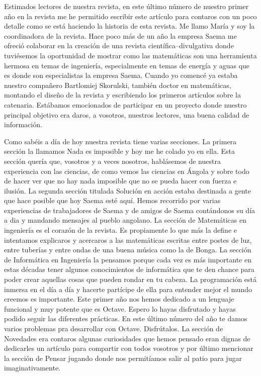 \begin{multicols}{2}
\cappar Estimados lectores de nuestra revista, en este último número de nuestro primer año en la revista me he permitido escribir este artículo para contaros con un poco detalle como se está haciendo la historia de esta revista. Me llamo María y soy la coordinadora de la revista. Hace poco más de un año la empresa Saema me ofreció colaborar en la creación de una revista científica--divulgativa donde tuviésemos la oportunidad de mostrar como las matemáticas son una herramienta hermosa en temas de ingeniería, especialmente en temas de energía y aguas que es donde son especialistas la empresa Saema. Cuando yo comencé ya estaba nuestro compañero Bartlomiej Skorulski, también doctor en matemáticas, montando el diseño de la revista y escribiendo los primeros artículos sobre la catenaria. Estábamos emocionados de participar en un proyecto donde nuestro principal objetivo era daros, a vosotros, nuestros lectores, una buena calidad de información.

 Como sabéis a día de hoy nuestra revista tiene varias secciones. La primera sección la llamamos Nada es imposible y hoy me he colado yo en ella. Esta sección quería que, vosotros y a veces nosotros, hablásemos de nuestra experiencia con las ciencias, de como vemos las ciencias en Ángola y sobre todo de hacer ver que no hay nada imposible que no se pueda hacer con fuerza e ilusión. La segunda sección titulada Solución en acción estaba destinada a gente que hace posible que hoy Saema esté aquí. Hemos recorrido por varias experiencias de trabajadores de Saema y de amigos de Saema contándonos su día a dia y mandando mensajes al pueblo angolano. La sección de Matemáticas en ingeniería es el corazón de la revista. Es propiamente lo que más la define e intentamos explicaros y acercaros a las matemáticas escritas entre postes de luz, entre tuberías y entre ondas de una buena música como la de Bonga. La sección de Informática en Ingeniería la pensamos porque cada vez es más importante en estas décadas tener algunos conocimientos de informática que te den chance para poder crear aquellas cosas que pueden rondar en tu cabeza. La programación está inmersa en el día a día y hacerte partícipe de ella para entender mejor el mundo creemos es importante. Este primer año nos hemos dedicado a un lenguaje funcional y muy potente que es Octave. Espero lo hayas disfrutado y hayas podido seguir las diferentes prácticas. En este último número del año te damos varios problemas pra desarrollar con Octave. Disfrútalos. La sección de Novedades era contaros algunas curiosidades que hemos pensado eran dignas de dedicarles un artículo para compartir con todos vosotros y por último mencionar la sección de Pensar jugando donde nos permitíamos salir al patio para jugar imaginativamente. 


\end{multicols}
